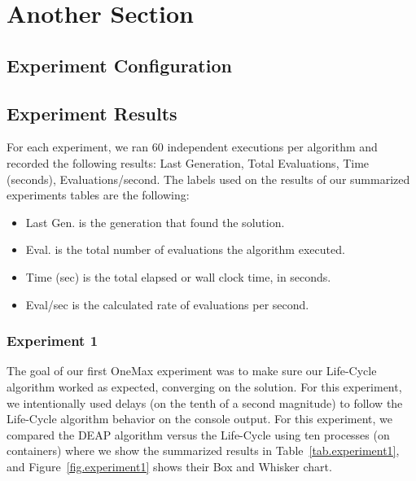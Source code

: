 \documentclass[graybox]{svmult}
\begin{document}

\section{Another Section}
\label{section.another_section}

\subsection{Experiment Configuration}

\subsection{Experiment Results}

For each experiment, we ran 60 independent executions per algorithm and
recorded the following results: Last Generation, Total Evaluations, Time
(seconds), Evaluations/second. The labels used on the results of our summarized
experiments tables are the following:

\begin{itemize}
    \item   Last Gen.   is the generation that found the solution.
    \item   Eval.       is the total number of evaluations the algorithm executed. 
    \item   Time (sec)  is the total elapsed or wall clock time, in seconds. 
    \item   Eval/sec    is the calculated rate of evaluations per second.
\end{itemize}


\subsubsection{Experiment 1} The goal of our first OneMax experiment was to
make sure our Life-Cycle algorithm worked as expected, converging on the
solution. For this experiment, we intentionally used delays (on the tenth of a
second magnitude) to follow the Life-Cycle algorithm behavior on the console
output. For this experiment, we compared the DEAP algorithm versus the
Life-Cycle using ten processes (on containers) where we show the summarized
results in Table~\ref{tab.experiment1}, and Figure~\ref{fig.experiment1} shows
their Box and Whisker chart.
\end{document}
